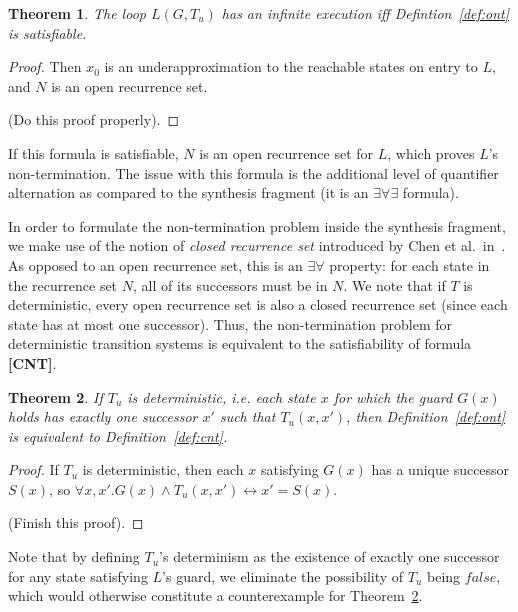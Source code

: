 \documentclass[preprint]{sigplanconf}
\newtheorem{theorem}{Theorem}
\theoremstyle{definition}
\begin{document}
\begin{theorem}
\label{thm:ont}
 The loop $L(G, T_u)$ has an infinite execution iff Defintion~\ref{def:ont} is satisfiable.
\end{theorem}

\begin{proof}
 Then $x_0$ is an underapproximation to the reachable states on entry to $L$, and $N$ is an open recurrence set.
 
 (Do this proof properly).
\end{proof}

If this formula is satisfiable, $N$ is an open recurrence set for $L$, which proves
$L$'s non-termination. The issue with this formula is the additional level of quantifier alternation as compared to the synthesis fragment
(it is an $\exists \forall \exists$ formula). %

In order to formulate the non-termination problem inside the synthesis
fragment, we make use of the notion of \emph{closed recurrence set}
introduced by Chen et al.~in~\cite{DBLP:conf/tacas/ChenCFNO14}.  As opposed
to an open recurrence set, this is an $\exists \forall$ property: for each
state in the recurrence set $N$, all of its successors must be in $N$.  We
note that if $T$ is deterministic, every open recurrence set is also a
closed recurrence set (since each state has at most one successor).  Thus,
the non-termination problem for deterministic transition systems is
equivalent to the satisfiability of formula {\bf [CNT]}.



\begin{theorem}
\label{thm:cnt}
 If $T_u$ is deterministic, i.e. each state $x$ for which the guard $G(x)$ holds has exactly one successor $x'$ such that $T_u(x, x')$, then
 Definition~\ref{def:ont} is equivalent to Definition~\ref{def:cnt}.
\end{theorem}

\begin{proof}
 If $T_u$ is deterministic, then each $x$ satisfying $G(x)$ has a unique successor $S(x)$, so $\forall x, x' . G(x) \wedge T_u(x, x') \leftrightarrow x' = S(x)$.
 
 (Finish this proof).
\end{proof}

Note that by defining $T_u$'s determinism as the existence of exactly one
successor for any state satisfying $L$'s guard, we eliminate the possibility
of $T_u$ being $\mathit{false}$, which would otherwise constitute a
counterexample for Theorem~\ref{thm:cnt}.
\end{document}
